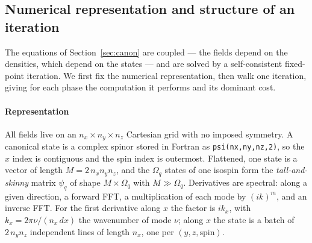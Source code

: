 \documentclass[preprint,12pt]{elsarticle}
\numberwithin{equation}{section}
\begin{document}
\subsection{Numerical representation and structure of an iteration}\label{sec:iter}
The equations of Section~\ref{sec:canon} are coupled --- the fields depend on the densities, which depend on the states --- and are solved by a self-consistent fixed-point iteration. We first fix the numerical representation, then walk one iteration, giving for each phase the computation it performs and its dominant cost.

\paragraph{Representation}
All fields live on an $n_x\times n_y\times n_z$ Cartesian grid with no imposed symmetry. A canonical state is a complex spinor stored in Fortran as \texttt{psi(nx,ny,nz,2)}, so the $x$ index is contiguous and the spin index is outermost. Flattened, one state is a vector of length $M=2\,n_xn_yn_z$, and the $\Omega_q$ states of one isospin form the \emph{tall-and-skinny} matrix $\psi_q$ of shape $M\times\Omega_q$ with $M\gg\Omega_q$. Derivatives are spectral: along a given direction, a forward FFT, a multiplication of each mode by $(ik)^m$, and an inverse FFT. For the first derivative along $x$ the factor is $ik_x$, with $k_x=2\pi\nu/(n_x\,dx)$ the wavenumber of mode $\nu$; along $x$ the state is a batch of $2\,n_yn_z$ independent lines of length $n_x$, one per $(y,z,\text{spin})$.
\end{document}
